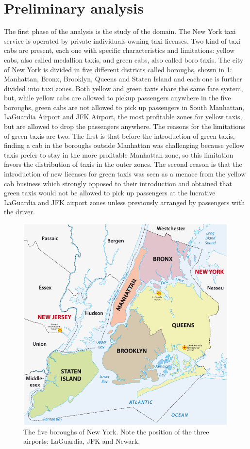 \documentclass{acm_proc_article-sp-sigmod09}
\begin{document}
\section{Preliminary analysis}
\label{sec:preliminaryAnalysis}
The first phase of the analysis is the study of the domain. The New York taxi service is operated by private individuals owning taxi licenses. Two kind of taxi cabs are present, each one with specific characteristics and limitations: yellow cabs, also called medallion taxis, and green cabs, also called boro taxis. The city of New York is divided in five different districts called boroughs, shown in \cref{fig:boroughsMap}: Manhattan, Bronx, Brooklyn, Queens and Staten Island and each one is further divided into taxi zones. Both yellow and green taxis share the same fare system, but, while yellow cabs are allowed to pickup passengers anywhere in the five boroughs, green cabs are not allowed to pick up passengers in South Manhattan, LaGuardia Airport and JFK Airport, the most profitable zones for yellow taxis, but are allowed to drop the passengers anywhere. The reasons for the limitations of green taxis are two. The first is that before the introduction of green taxis, finding a cab in the boroughs outside Manhattan was challenging because yellow taxis prefer to stay in the more profitable Manhattan zone, so this limitation favors the distribution of taxis in the outer zones. The second reason is that the introduction of new licenses for green taxis was seen as a menace from the yellow cab business which strongly opposed to their introduction and obtained that green taxis would not be allowed to pick up passengers at the lucrative LaGuardia and JFK airport zones unless previously arranged by passengers with the driver.

\begin{figure}
	\centering
	\includegraphics{resources/boroughsMap.jpg}
	\caption{The five boroughs of New York. Note the position of the three airports: LaGuardia, JFK and Newark.}
	\label{fig:boroughsMap}
\end{figure}
\end{document}
